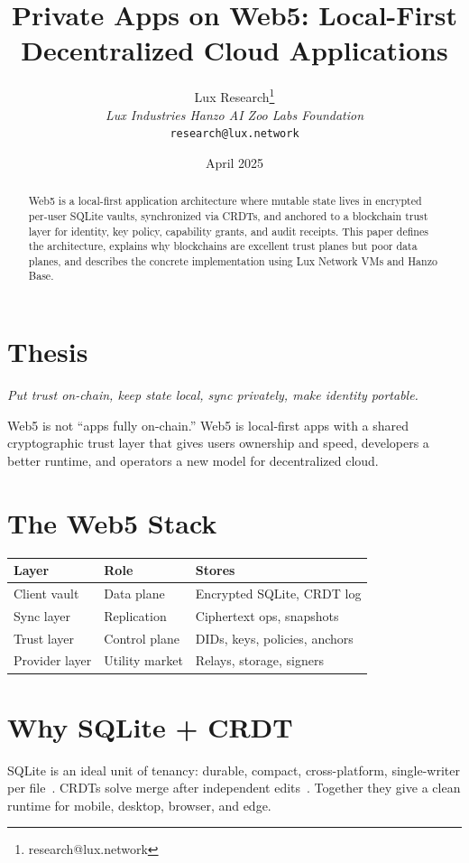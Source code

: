 \documentclass[twocolumn,11pt]{article}
\title{\textbf{Private Apps on Web5: Local-First Decentralized Cloud Applications}}
\author{
Lux Research\thanks{research@lux.network}\\
\textit{Lux Industries \quad Hanzo AI \quad Zoo Labs Foundation}\\
\texttt{research@lux.network}
}
\date{April 2025}
\begin{document}
\luxcoverpage

\begin{abstract}
Web5 is a local-first application architecture where mutable state lives in encrypted per-user SQLite vaults, synchronized via CRDTs, and anchored to a blockchain trust layer for identity, key policy, capability grants, and audit receipts. This paper defines the architecture, explains why blockchains are excellent trust planes but poor data planes, and describes the concrete implementation using Lux Network VMs and Hanzo Base.
\end{abstract}

\section{Thesis}

\textit{Put trust on-chain, keep state local, sync privately, make identity portable.}

Web5 is not ``apps fully on-chain.'' Web5 is local-first apps with a shared cryptographic trust layer that gives users ownership and speed, developers a better runtime, and operators a new model for decentralized cloud.

\section{The Web5 Stack}

\begin{center}
\begin{tabular}{lll}
\toprule
\textbf{Layer} & \textbf{Role} & \textbf{Stores} \\
\midrule
Client vault & Data plane & Encrypted SQLite, CRDT log \\
Sync layer & Replication & Ciphertext ops, snapshots \\
Trust layer & Control plane & DIDs, keys, policies, anchors \\
Provider layer & Utility market & Relays, storage, signers \\
\bottomrule
\end{tabular}
\end{center}

\section{Why SQLite + CRDT}

SQLite is an ideal unit of tenancy: durable, compact, cross-platform, single-writer per file~\cite{sqlite2020}. CRDTs solve merge after independent edits~\cite{shapiro2011}. Together they give a clean runtime for mobile, desktop, browser, and edge.
\end{document}
